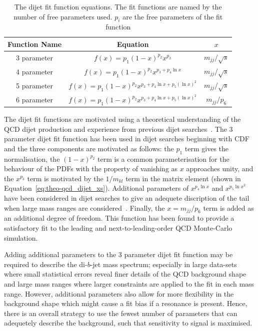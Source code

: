 {\renewcommand{\arraystretch}{1.2}
\begin{table}[!thb]
\centering
\begin{tabular}{|c||c|c|}
  \hline
  Function Name & Equation                                          & $x$ \\
  \hline
  3 parameter   & $f(x)=p_1(1-x)^{p_2}x^{p_3}$                         & $m_{jj}/\sqrt{s}$ \\
  4 parameter   & $f(x)=p_1(1-x)^{p_2}x^{p_3+p_4\ln{x}}$                &$m_{jj}/\sqrt{s}$\\
  5 parameter   & $f(x)=p_1(1-x)^{p_2}x^{p_3+p_4\ln{x}+p_5(\ln{x})^{2}}$   & $m_{jj}/\sqrt{s}$\\ 
  6 parameter   & $f(x)=p_1(1-x)^{p_2}x^{p_3+p_4\ln{x}+p_5(\ln{x})^{2}}$   &  $m_{jj}/p_6$\\ 
  \hline
\end{tabular}
\caption{The dijet fit function equations. The fit functions are named by the number of free parameters used. $p_{i}$ are the free parameters of the fit function}
\label{tab:bkg-fit}
\end{table}}

The dijet fit functions are motivated using a theoretical understanding of the QCD dijet production
and experience from previous dijet searches~\cite{theo-dijet_harris}.
The 3 parameter dijet fit function has been used in dijet searches beginning with CDF~\cite{dijet-CDF_3par}
and the three components are motivated as follows:
the $p_1$ term gives the normalisation,
the $(1-x)^{p_2}$ term is a common parameterisation for the behaviour of the PDFs with the property of vanishing as $x$ approaches unity,
and the $x^{p_3}$ term is motivated by the $1/m_{kl}$ term in the matrix element (shown in Equation~\ref{eq:theo-qcd_dijet_xs}).
Additional parameters of $x^{p_4\ln{x}}$ and $x^{p_5\ln{x}^{2}}$ have been considered in dijet searches to give an adequete discription of the tail
when large mass ranges are considered~\cite{dijet-CDF_4par,dijet-mori16_int}.
Finally, the $x=m_{jj}/p_6$ term is added as an additional degree of freedom.
This function has been found to provide a satisfactory fit to the leading and next-to-leading-order QCD Monte-Carlo simulation.


Adding additional parameters to the 3 parameter dijet fit function may be required to describe the di-$b$-jet mass spectrum;
especially in large data-sets where small statistical errors reveal finer details of the QCD background shape
and large mass ranges where larger constraints are applied to the fit in each mass range.
However, additional parameters also allow for more flexibility in the background shape
which might cause a fit bias if a resonance is present.
Hence, there is an overall strategy to use the fewest number of parameters
that can adequetely describe the background,
such that sensitivity to signal is maximised.

